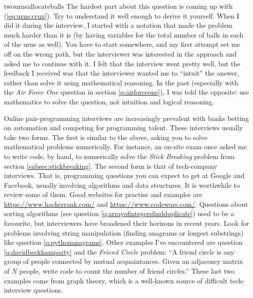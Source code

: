 \begin{answer}{twournsallocateballs}
The hardest part about this question is coming up with (\ref{eq:urns:crux}).
Try to understand it well enough to derive it yourself.
When I did it during the interview, I started with a notation that made the problem much harder than it is (by having variables for the total number of balls in each of the urns as well).
You have to start somewhere, and my first attempt set me off on the wrong path,
but the interviewer was interested in the approach and asked me to continue with it.
I felt that the interview went pretty well, but the feedback I received was that the interviewer wanted me to ``intuit'' the answer, rather than solve it using mathematical reasoning.
In the past (especially with the \emph{Air Force One} question in section \ref{q:airforceone}), I was told the opposite: use mathematics to solve the question, not intuition and logical reasoning.

Online pair-programming interviews are increasingly prevalent with banks betting on automation and competing for programming talent.
These interviews usually take two forms.
The first is similar to the above, asking you to solve mathematical problems numerically.
For instance, an on-site exam once asked me to write code, by hand, to numerically solve the \emph{Stick Breaking} problem from section \ref{subsec:stickbreaking}.
The second form is that of tech-company interviews.
That is, programming questions you can expect to get at Google and Facebook, usually involving algorithms and data structures.
It is worthwhile to review some of them.
Good websites for practise and examples are
\url{https://www.hackerrank.com/} and
\url{https://www.codewars.com/}.
Questions about sorting algorithms (see question \ref{q:arrayofintegersfindduplicate}) used to be a favourite, but interviewers have broadened their horizons in recent years.
Look for problems involving string manipulation (finding anagrams or longest substrings) like question \ref{q:pythonanagrams}.
Other examples I've encountered are question
\ref{q:davidbeckhamparty} and the \emph{Friend Circle} problem:
``A friend circle is any group of people connected by mutual acquaintances. Given an adjacency matrix of $N$ people, write code to count the number of friend circles.''
These last two examples come from graph theory, which is a well-known source of difficult tech-interview questions.


\end{answer}
